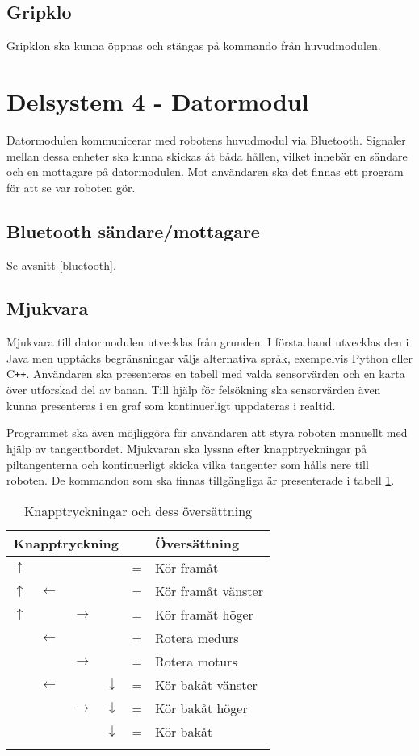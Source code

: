 \documentclass[11pt]{article}
\begin{document}
\begin{flushleft}
\subsection{Gripklo}
Gripklon ska kunna öppnas och stängas på kommando från huvudmodulen. 

\pagebreak
\section{Delsystem 4 - Datormodul}
Datormodulen kommunicerar med robotens huvudmodul via Bluetooth\textsuperscript{\circledR}. Signaler mellan dessa enheter ska kunna skickas åt båda hållen, vilket innebär en sändare och en mottagare på datormodulen. Mot användaren ska det finnas ett program för att se var roboten gör.
\subsection{Bluetooth\textsuperscript{\circledR} sändare/mottagare}
Se avsnitt \ref{bluetooth}.
\subsection{Mjukvara}
Mjukvara till datormodulen utvecklas från grunden. I första hand utvecklas den i Java men upptäcks begränsningar väljs alternativa språk, exempelvis Python eller C\texttt{++}. Användaren ska presenteras en tabell med valda sensorvärden och en karta över utforskad del av banan. Till hjälp för felsökning ska sensorvärden även kunna presenteras i en graf som kontinuerligt uppdateras i realtid. 

Programmet ska även möjliggöra för användaren att styra roboten manuellt med hjälp av tangentbordet. Mjukvaran ska lyssna efter knapptryckningar på piltangenterna och kontinuerligt skicka vilka tangenter som hålls nere till roboten. De kommandon som ska finnas tillgängliga är presenterade i tabell \ref{commands}.

\begin{longtable}{|p{.05\linewidth} p{.05\linewidth} p{.05\linewidth} p{.05\linewidth} c l|}
	\multicolumn{4}{c}{\textbf{Knapptryckning}} & & \multicolumn{1}{l}{\textbf{Översättning}} 	\\ \hline\hline
	$\uparrow$ &  				&  				& 				& = & Kör framåt 				\\ \hline
	$\uparrow$ & $\leftarrow$	&				&				& = & Kör framåt vänster 		\\ \hline
	$\uparrow$ &				& $\rightarrow$	&				& = & Kör framåt höger 			\\ \hline
			   & $\leftarrow$	&				&				& = & Rotera medurs 			\\ \hline
			   &				& $\rightarrow$	&				& = & Rotera moturs 			\\ \hline
			   & $\leftarrow$	&				& $\downarrow$	& = & Kör bakåt vänster 		\\ \hline
			   &				& $\rightarrow$ & $\downarrow$	& = & Kör bakåt höger 			\\ \hline
			   &				&				& $\downarrow$	& = & Kör bakåt 				\\ \hline
	\caption{Knapptryckningar och dess översättning} \label{commands}
\end{longtable}


\end{flushleft}
\end{document}
